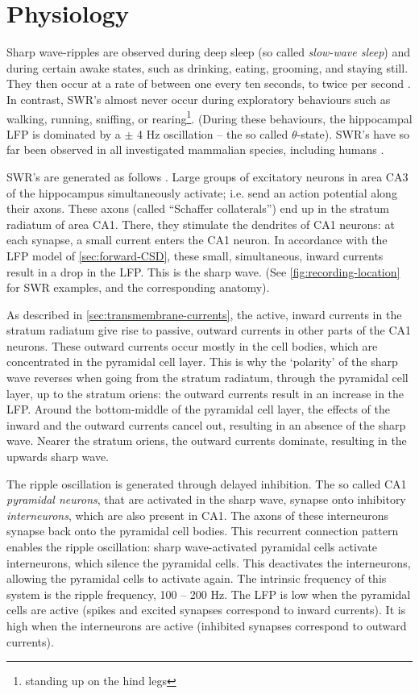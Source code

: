 \section{Physiology}
\label{sec:physiology}

Sharp wave-ripples are observed during deep sleep (so called \emph{slow-wave sleep}) and during certain awake states, such as drinking, eating, grooming, and staying still. They then occur at a rate of between one every ten seconds, to twice per second \cite{Girardeau2011}. In contrast, SWR's almost never occur during exploratory behaviours such as walking, running, sniffing, or rearing\footnote{standing up on the hind legs}. (During these behaviours, the hippocampal LFP is dominated by a $\pm$ 4 Hz oscillation -- the so called $\theta$-state). SWR's have so far been observed in all investigated mammalian species, including humans \cite{Buzsaki2015}.

SWR's are generated as follows \cite{Girardeau2011,Buzsaki2015}. Large groups of excitatory neurons in area CA3 of the hippocampus simultaneously activate; i.e. send an action potential along their axons. These axons (called ``Schaffer collaterals'') end up in the stratum radiatum of area CA1. There, they stimulate the dendrites of CA1 neurons: at each synapse, a small current enters the CA1 neuron. In accordance with the LFP model of \cref{sec:forward-CSD}, these small, simultaneous, inward currents result in a drop in the LFP. This is the sharp wave. (See \cref{fig:recording-location} for SWR examples, and the corresponding anatomy).

As described in \cref{sec:transmembrane-currents}, the active, inward currents in the stratum radiatum give rise to passive, outward currents in other parts of the CA1 neurons. These outward currents occur mostly in the cell bodies, which are concentrated in the pyramidal cell layer. This is why the `polarity' of the sharp wave reverses when going from the stratum radiatum, through the pyramidal cell layer, up to the stratum oriens: the outward currents result in an increase in the LFP. Around the bottom-middle of the pyramidal cell layer, the effects of the inward and the outward currents cancel out, resulting in an absence of the sharp wave. Nearer the stratum oriens, the outward currents dominate, resulting in the upwards sharp wave.

The ripple oscillation is generated through delayed inhibition. The so called CA1 \emph{pyramidal neurons}, that are activated in the sharp wave, synapse onto inhibitory \emph{interneurons}, which are also present in CA1. The axons of these interneurons synapse back onto the pyramidal cell bodies. This recurrent connection pattern enables the ripple oscillation: sharp wave-activated pyramidal cells activate interneurons, which silence the pyramidal cells. This deactivates the interneurons, allowing the pyramidal cells to activate again. The intrinsic frequency of this system is the ripple frequency, 100 -- 200 Hz. The LFP is low when the pyramidal cells are active (spikes and excited synapses correspond to inward currents). It is high when the interneurons are active (inhibited synapses correspond to outward currents).
